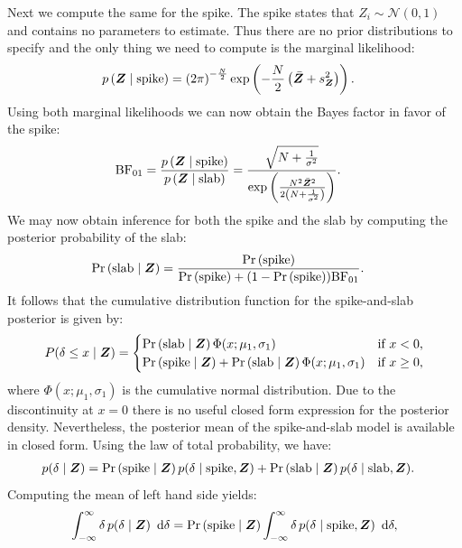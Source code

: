 \documentclass[a4paper]{article}
\newcommand{\shypo}[1]{%
	\ifnum#1>0%
		\mathrm{slab}
	\else%
		\mathrm{spike}
	\fi%
}
\newcommand{\dataZ}	{\bm{Z}}
\newcommand{\dataZi}{Z_i}
\newcommand{\meanZ}	{\bar{\dataZ}}
\newcommand{\varZ}	{s_{\dataZ}^2}
\newcommand{\probp}[1]{p\left(#1\right)}
\newcommand{\probo}{\mathrm{Pr}}
\newcommand{\prob}[1]{\probo\left(#1\right)}
\newcommand{\dnorm}[2]{\mathcal{N}\left(#1, #2\right)}
\newcommand{\dx}[1]{\enspace\mathrm{d}{#1}}
\newenvironment{revision}{\color{teal}}{\color{black}}
\begin{document}
\begin{revision}
Next we compute the same for the spike. The spike states that $\dataZi\sim \dnorm{0}{1}$ and contains no parameters to estimate. Thus there are no prior distributions to specify and the only thing we need to compute is the marginal likelihood:
\begin{align*}
	\probp{\dataZ\mid\shypo{0}} &= 
	\left(2\pi\right)^{-\frac{N}{2}}
	\exp\left(-\frac{N}{2}\left(\meanZ + \varZ\right)\right).
\end{align*}
Using both marginal likelihoods we can now obtain the Bayes factor in favor of the spike:
\begin{align*}
	\text{BF}_{01} &= \frac{\probp{\dataZ\mid\shypo{0}}}{\probp{\dataZ\mid\shypo{1}}} =
	\frac{
		\sqrt{N+\frac{1}{\sigma^2}}
	}{
		\exp\left(\frac{N^2 \meanZ^2}{2\left(N+\frac{1}{\sigma^2}\right)}\right)		
	}.
\end{align*}
We may now obtain inference for both the spike and the slab by computing the posterior probability of the slab:
\begin{align*}
	\prob{\shypo{1}\mid \dataZ} &= \frac{\prob{\shypo{0}}}{\prob{\shypo{0}} + (1 - \prob{\shypo{0}})\text{BF}_{01}}.
\end{align*}
It follows that the cumulative distribution function for the spike-and-slab posterior is given by:
\begin{align*}
	P(\delta\leq x \mid \dataZ) =
	\begin{cases}
	\prob{\shypo{1}\mid \dataZ}\Phi(x;\mu_1,\sigma_1)	 							& \text{if $x < 0$,} \\
	\prob{\shypo{0}\mid \dataZ} + \prob{\shypo{1}\mid \dataZ}\Phi(x;\mu_1,\sigma_1)	& \text{if $x \geq 0$,}\\
	\end{cases}
\end{align*}
where $\Phi(x;\mu_1,\sigma_1)$ is the cumulative normal distribution. Due to the discontinuity at $x = 0$ there is no useful closed form expression for the posterior density. Nevertheless, the posterior mean of the spike-and-slab model is available in closed form. Using the law of total probability, we have: 
\begin{align*}
	p(\delta\mid \dataZ) &= \prob{\shypo{0}\mid \dataZ}p(\delta\mid\shypo{0}, \dataZ) + \prob{\shypo{1}\mid \dataZ}p(\delta\mid\shypo{1}, \dataZ).
\end{align*}
Computing the mean of left hand side yields:
\begin{align*}
	\int_{-\infty}^\infty \delta \, p(\delta\mid \dataZ) \dx{\delta} &= 
	\prob{\shypo{0}\mid \dataZ}\int_{-\infty}^\infty\delta \, p(\delta\mid\shypo{0}, \dataZ) \dx{\delta}, \\

\end{align*}
\end{revision}
\end{document}
